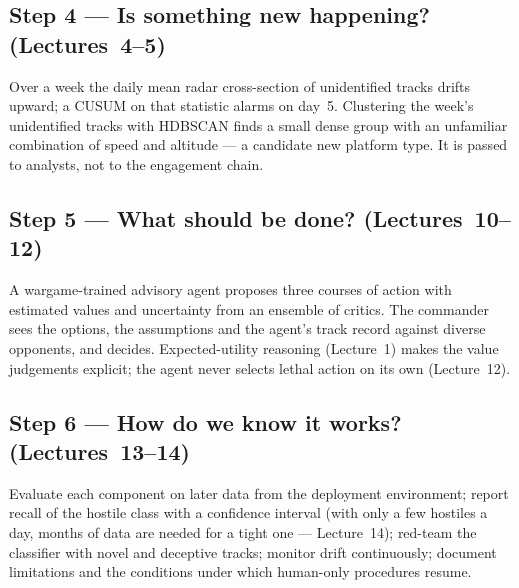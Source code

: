 \documentclass[11pt]{article}
\begin{document}
\subsection{Step 4 --- Is something new happening? (Lectures~4--5)}
Over a week the daily mean radar cross-section of unidentified tracks drifts upward; a CUSUM on that statistic alarms on day~5. Clustering the week's unidentified tracks with HDBSCAN finds a small dense group with an unfamiliar combination of speed and altitude --- a candidate new platform type. It is passed to analysts, not to the engagement chain.
\subsection{Step 5 --- What should be done? (Lectures~10--12)}
A wargame-trained advisory agent proposes three courses of action with estimated values and uncertainty from an ensemble of critics. The commander sees the options, the assumptions and the agent's track record against diverse opponents, and decides. Expected-utility reasoning (Lecture~1) makes the value judgements explicit; the agent never selects lethal action on its own (Lecture~12).
\subsection{Step 6 --- How do we know it works? (Lectures~13--14)}
Evaluate each component on later data from the deployment environment; report recall of the hostile class with a confidence interval (with only a few hostiles a day, months of data are needed for a tight one --- Lecture~14); red-team the classifier with novel and deceptive tracks; monitor drift continuously; document limitations and the conditions under which human-only procedures resume.
\end{document}
